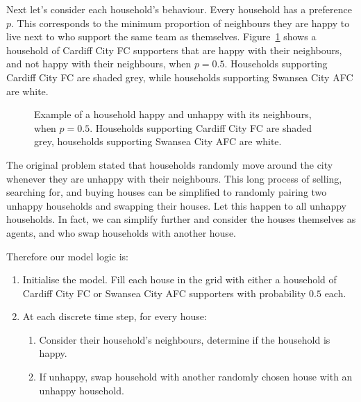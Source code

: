 Next let's consider each household's behaviour.
Every household has a preference $p$.
This corresponds to the minimum proportion of neighbours they are happy to live
next to who support the same team as themselves.
Figure~\ref{fig:schelling_happyunhappy} shows a household of Cardiff City FC
supporters that are happy with their neighbours, and not happy with their
neighbours, when $p=0.5$. Households supporting Cardiff City FC are shaded grey,
while households supporting Swansea City AFC are white.

\begin{figure}
\begin{center}
\subfigure[A happy household, with 6 similar neighbours ($\frac{6}{8} > p = 0.5$)]{}
\subfigure[An unhappy household, with 2 similar neighbours ($\frac{2}{8} < p = 0.5$)]{}
\end{center}
\caption{Example of a household happy and unhappy with its neighbours, when
$p=0.5$. Households supporting Cardiff City FC are shaded grey, households
supporting Swansea City AFC are white.}
\label{fig:schelling_happyunhappy}
\end{figure}

The original problem stated that households randomly move around the city
whenever they are unhappy with their neighbours.
This long process of selling, searching for, and buying houses can be simplified
to randomly pairing two unhappy households and swapping their houses.
Let this happen to all unhappy households.
In fact, we can simplify further and consider the houses themselves as agents,
and who swap households with another house.

Therefore our model logic is:

\begin{enumerate}
  \item Initialise the model. Fill each house in the grid with either a
  household of Cardiff City FC or Swansea City AFC supporters with
  probability $0.5$ each.
  \item At each discrete time step, for every house:
  \begin{enumerate}
    \item Consider their household's neighbours, determine if the household is
    happy.
    \item If unhappy, swap household with another randomly chosen house with an
    unhappy household.
  \end{enumerate}
\end{enumerate}

